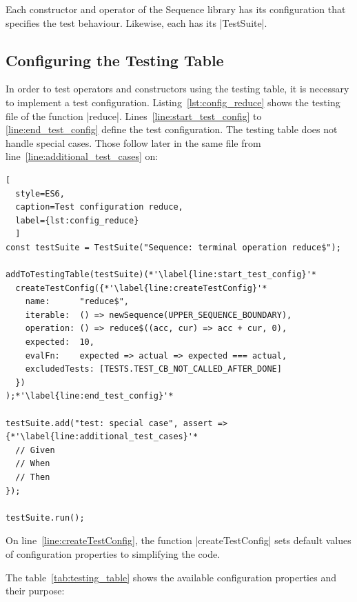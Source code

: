 Each constructor and operator of the Sequence library has its configuration
that specifies the test behaviour. Likewise, each has its |TestSuite|. 

\subsection{Configuring the Testing Table}
\label{sub:Configuring the Testing Table}

In order to test operators and constructors using the testing table, it is
necessary to implement a test configuration.
Listing~\ref{lst:config_reduce} shows the testing file of the function |reduce|. 
Lines~\ref{line:start_test_config} to \ref{line:end_test_config} define the test 
configuration. The testing table does not handle special cases. Those follow 
later in the same file from line~\ref{line:additional_test_cases} on:

\begin{lstlisting}[
  style=ES6, 
  caption=Test configuration reduce,
  label={lst:config_reduce}
  ]
const testSuite = TestSuite("Sequence: terminal operation reduce$");

addToTestingTable(testSuite)(*'\label{line:start_test_config}'*
  createTestConfig({*'\label{line:createTestConfig}'*
    name:      "reduce$",
    iterable:  () => newSequence(UPPER_SEQUENCE_BOUNDARY),
    operation: () => reduce$((acc, cur) => acc + cur, 0),
    expected:  10,
    evalFn:    expected => actual => expected === actual,
    excludedTests: [TESTS.TEST_CB_NOT_CALLED_AFTER_DONE]
  })
);*'\label{line:end_test_config}'*

testSuite.add("test: special case", assert => {*'\label{line:additional_test_cases}'*
  // Given
  // When
  // Then
});

testSuite.run();
\end{lstlisting}

On line~\ref{line:createTestConfig}, the function |createTestConfig|  sets
default values of configuration properties to simplifying the code.

The table~\ref{tab:testing_table} shows the available configuration 
properties and their purpose:


